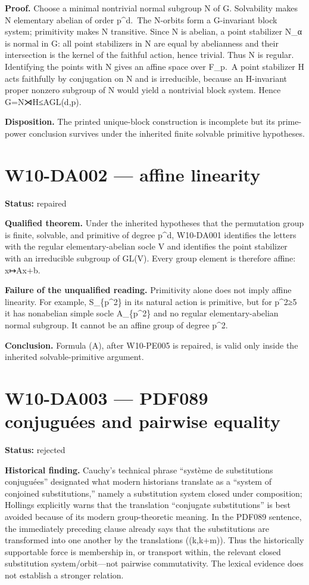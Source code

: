 \documentclass[
  10pt,
  a4paper,
]{scrreprt}
\begin{document}
\textbf{Proof.} Choose a minimal nontrivial normal subgroup N of G.
Solvability makes N elementary abelian of order p\^{}d.~The N-orbits
form a G-invariant block system; primitivity makes N transitive. Since N
is abelian, a point stabilizer N\_α is normal in G: all point
stabilizers in N are equal by abelianness and their intersection is the
kernel of the faithful action, hence trivial. Thus N is regular.
Identifying the points with N gives an affine space over F\_p.~A point
stabilizer H acts faithfully by conjugation on N and is irreducible,
because an H-invariant proper nonzero subgroup of N would yield a
nontrivial block system. Hence G=N⋊H≤AGL(d,p).

\textbf{Disposition.} The printed unique-block construction is
incomplete but its prime-power conclusion survives under the inherited
finite solvable primitive hypotheses.

\section{W10-DA002 --- affine
linearity}\label{w10-da002-affine-linearity}

\textbf{Status:} repaired

\textbf{Qualified theorem.} Under the inherited hypotheses that the
permutation group is finite, solvable, and primitive of degree p\^{}d,
W10-DA001 identifies the letters with the regular elementary-abelian
socle V and identifies the point stabilizer with an irreducible subgroup
of GL(V). Every group element is therefore affine: x↦Ax+b.

\textbf{Failure of the unqualified reading.} Primitivity alone does not
imply affine linearity. For example, S\_\{p\^{}2\} in its natural action
is primitive, but for p\^{}2≥5 it has nonabelian simple socle
A\_\{p\^{}2\} and no regular elementary-abelian normal subgroup. It
cannot be an affine group of degree p\^{}2.

\textbf{Conclusion.} Formula (A), after W10-PE005 is repaired, is valid
only inside the inherited solvable-primitive argument.

\section{W10-DA003 --- PDF089 conjuguées and pairwise
equality}\label{w10-da003-pdf089-conjuguuxe9es-and-pairwise-equality}

\textbf{Status:} rejected

\textbf{Historical finding.} Cauchy's technical phrase ``système de
substitutions conjuguées'' designated what modern historians translate
as a ``system of conjoined substitutions,'' namely a substitution system
closed under composition; Hollings explicitly warns that the translation
``conjugate substitutions'' is best avoided because of its modern
group-theoretic meaning. In the PDF089 sentence, the immediately
preceding clause already says that the substitutions are transformed
into one another by the translations ((k,k+m)). Thus the historically
supportable force is membership in, or transport within, the relevant
closed substitution system/orbit---not pairwise commutativity. The
lexical evidence does not establish a stronger relation.
\end{document}
